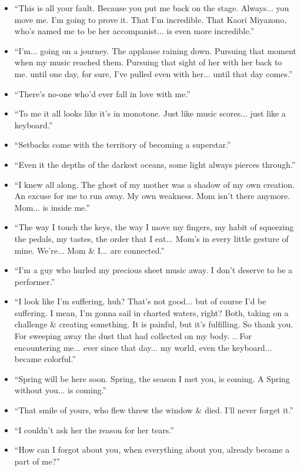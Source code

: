 \documentclass{article}
\begin{document}
\begin{enumerate}
\begin{itemize}
    	\item ``This is all your fault. Because you put me back on the stage. Always... you move me. I'm going to prove it. That I'm incredible. That Kaori Miyazono, who's named me to be her accompanist... is even more incredible.''
    	\item ``I'm... going on a journey. The applause raining down. Pursuing that moment when my music reached them. Pursuing that sight of her with her back to me. until one day, for sure, I've pulled even with her... until that day comes.''
    	\item ``There's no-one who'd ever fall in love with me.''
    	\item ``To me it all looks like it's in monotone. Just like music scores... just like a keyboard.''
    	\item ``Setbacks come with the territory of becoming a superstar.''
    	\item ``Even it the depths of the darkest oceans, some light always pierces through.''
    	\item ``I knew all along. The ghost of my mother was a shadow of my own creation. An excuse for me to run away. My own weakness. Mom isn't there anymore. Mom... is inside me.''
    	\item ``The way I touch the keys, the way I move my fingers, my habit of squeezing the pedals, my tastes, the order that I eat... Mom's in every little gesture of mine. We're... Mom \& I... are connected.''
    	\item ``I'm a guy who hurled my precious sheet music away. I don't deserve to be a performer.''
    	\item ``I look like I'm suffering, huh? That's not good... but of course I'd be suffering. I mean, I'm gonna sail in charted waters, right? Both, taking on a challenge \& creating something. It is painful, but it's fulfilling. So thank you. For sweeping away the dust that had collected on my body. .. For encountering me... ever since that day... my world, even the keyboard... became colorful.''
    	\item ``Spring will be here soon. Spring, the season I met you, is coming. A Spring without you... is coming.''
    	\item ``That smile of yours, who flew threw the window \& died. I'll never forget it.''
    	\item ``I couldn't ask her the reason for her tears.''
    	\item ``How can I forgot about you, when everything about you, already became a part of me?''

\end{itemize}
\end{enumerate}
\end{document}

